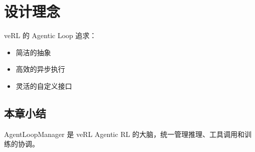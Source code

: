\section{设计理念}
veRL 的 Agentic Loop 追求：
\begin{itemize}
  \item 简洁的抽象
  \item 高效的异步执行
  \item 灵活的自定义接口
\end{itemize}

\subsection{本章小结}
AgentLoopManager 是 veRL Agentic RL 的大脑，统一管理推理、工具调用和训练的协调。

\newpage
